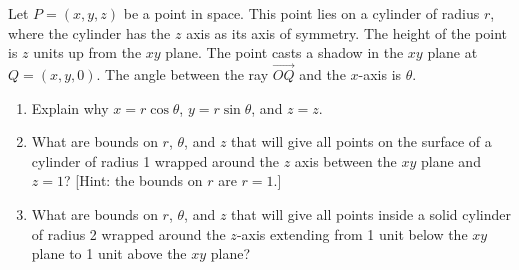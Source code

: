 \begin{problem} 
Let $P=(x,y,z)$ be a point in space. This point lies on a cylinder of radius $r$, where the cylinder has the $z$ axis as its axis of symmetry.  The height of the point is $z$ units up from the $xy$ plane. The point casts a shadow in the $xy$ plane at $Q=(x,y,0)$.  The angle between the ray $\vec{OQ}$ and the $x$-axis is $\theta$.
\begin{enumerate}
\item Explain why $x=r\cos\theta$, $y=r\sin\theta$, and $z=z$.
\item What are bounds on $r$, $\theta$, and $z$ that will give all points on the surface of a cylinder of radius 1 wrapped around the $z$ axis between the $xy$ plane and $z=1$?  [Hint: the bounds on $r$ are $r=1$.]
\item What are bounds on $r$, $\theta$, and $z$ that will give all points inside a solid cylinder of radius 2 wrapped around the $z$-axis extending from 1 unit below the $xy$ plane to 1 unit above the $xy$ plane?
\end{enumerate}
\end{problem}

